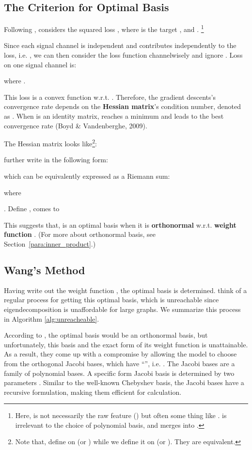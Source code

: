 \subsection{The Criterion for Optimal Basis}
\label{sec-Wang}

Following \citet{keyulu2021Optm}, 
\citet{Wang2022jacobi} considers the squared loss 
, 
where  is the target
, and  . \footnote{Here,  is not necessarily the raw feature () but often some thing like .  is irrelevant to the choice of polynomial basis, 
and merges  into .}

Since each signal channel is independent and contributes independently to the
loss, i.e. , we can
then consider the loss function channelwisely and ignore . Loss on one
signal channel  is:

where .

This loss is a convex function w.r.t. . Therefore, the gradient
descents's convergence rate depends on the {\textbf{Hessian matrix}}'s
condition number, denoted as . When  is an identity matrix,
 reaches a minimum and leads to the best convergence rate (Boyd \&
Vandenberghe, 2009).

The Hessian matrix  looks like\footnote{Note that, \citet{Wang2022jacobi}
{\small{}}define  on  (or ) while we define
it on  (or ). They are equivalent.}:






\citet{Wang2022jacobi} further write  in the following form:

which can be equivalently expressed as a Riemann sum:

where 

.
Define 
, 
 comes to

This suggests that, 
 is an optimal basis when it is
{\textbf{orthonormal}} w.r.t. {\textbf{weight function}} . (For
more about orthonormal basis, see Section~\ref{para:inner_product}.)

\subsection{Wang's Method}

Having write out the weight function , 
the optimal basis is determined. 
\citet{Wang2022jacobi} think of a regular process for getting this optimal
basis, which is unreachable since eigendecomposition is unaffordable for
large graphs. 
We summarize this process in Algorithm \ref{alg:unreacheable}.



According to \citet{Wang2022jacobi}, 
the optimal basis would be an orthonormal basis,
but unfortunately, this basis and the exact form of its weight function is
unattainable. 
As a result, 
they come up with a compromise by allowing the
model to choose from the orthogonal Jacobi bases, which have ``{}'', i.e. . The
Jacobi bases are a family of polynomial bases. A specific form Jacobi basis is
determined by two parameters . Similar to the well-known
Chebyshev basis, the Jacobi bases have a recursive formulation, making them
efficient for calculation.


  